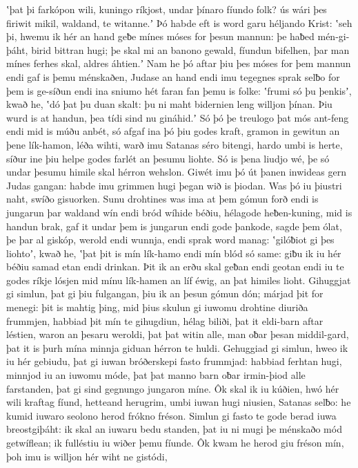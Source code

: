 ʽþat þi farkópon wili, kuningo ríkjost,
undar þínaro fíundo folk? ús wári þes firiwit mikil,
waldand, te witanne.ʼ Þó habde eft is word garu
héljando Krist: ʽseh þi, hwemu ik hér an hand geƀe
mínes móses for þesun mannun: þe haƀed mén-gi-þáht,
birid bittran hugi; þe skal mi an banono gewald,
fíundun bifelhen, þar man mínes ferhes skal,
aldres áhtien.ʼ Nam he þó aftar þiu
þes móses for þem mannun endi gaf is þemu ménskaðen,
Judase an hand endi imu tegegnes sprak
selƀo for þem is ge-síðun endi ina sniumo hét
faran fan þemu is folke: ʽfrumi só þu þenkisʼ, kwað he,
ʽdó þat þu duan skalt: þu ni maht bidernien leng
willjon þínan. Þiu wurd is at handun,
þea tídi sind nu gináhid.ʼ Só þó þe treulogo
þat mós ant-feng endi mid is múðu anbét,
só afgaf ina þó þiu godes kraft, gramon in gewitun
an þene lík-hamon, léða wihti,
warð imu Satanas séro bitengi,
hardo umbi is herte, síður ine þiu helpe godes
farlét an þesumu liohte. Só is þena liudjo wé,
þe só undar þesumu himile skal hérron wehslon.
Giwét imu þó út þanen inwideas gern
Judas gangan: habde imu grimmen hugi
þegan wið is þiodan. Was þó iu þiustri naht,
swíðo gisuorken. Sunu drohtines
was ima at þem gómun forð endi is jungarun þar
waldand wín endi bród wíhide béðiu,
hélagode heƀen-kuning, mid is handun brak,
gaf it undar þem is jungarun endi gode þankode,
sagde þem ólat, þe þar al giskóp,
werold endi wunnja, endi sprak word manag:
ʽgilóƀiot gi þes liohtoʼ, kwað he, ʽþat þit is mín lík-hamo
endi mín blód só same: giƀu ik iu hér béðiu samad
etan endi drinkan. Þit ik an erðu skal
geƀan endi geotan endi iu te godes ríkje
lósjen mid mínu lík-hamen an líf éwig,
an þat himiles lioht. Gihuggjat gi simlun,
þat gi þiu fulgangan, þiu ik an þesun gómun dón;
márjad þit for menegi: þit is mahtig þing,
mid þius skulun gi iuwomu drohtine diuriða frummjen,
habbiad þit mín te gihugdiun, hélag biliði,
þat it eldi-barn aftar léstien,
waron an þesaru weroldi, þat þat witin alle,
man oƀar þesan middil-gard, þat it is þurh mína minnja giduan
hérron te huldi. Gehuggiad gi simlun,
hweo ik iu hér gebiudu, þat gi iuwan bróðerskepi
fasto frummjad: habbiad ferhtan hugi,
minnjod iu an iuwomu móde, þat þat manno barn
oƀar irmin-þiod alle farstanden,
þat gi sind gegnungo jungaron míne.
Ôk skal ik iu kúðien, hwó hér wili kraftag fíund,
hetteand herugrim, umbi iuwan hugi niusien,
Satanas selƀo: he kumid iuwaro seolono herod
frókno fréson. Simlun gi fasto te gode
berad iuwa breostgiþáht: ik skal an iuwaru bedu standen,
þat iu ni mugi þe ménskaðo mód getwíflean;
ik fulléstiu iu wiðer þemu fíunde. Ôk kwam he herod giu fréson mín,
þoh imu is willjon hér wiht ne gistódi,
